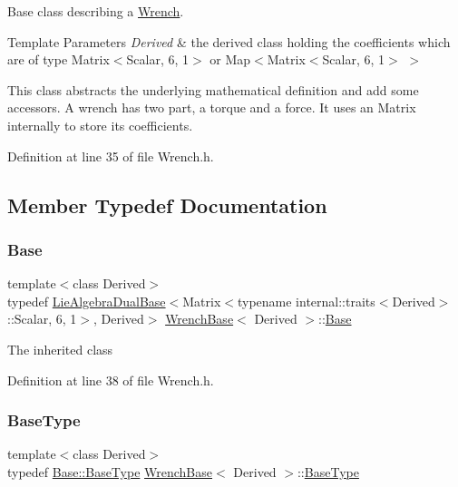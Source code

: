 Base class describing a \hyperlink{class_wrench}{Wrench}. 


\begin{DoxyTemplParams}{Template Parameters}
{\em Derived} & the derived class holding the coefficients which are of type Matrix$<$\+Scalar, 6, 1$>$ or Map$<$Matrix$<$\+Scalar, 6, 1$>$ $>$\\
\hline
\end{DoxyTemplParams}
This class abstracts the underlying mathematical definition and add some accessors. A wrench has two part, a torque and a force. It uses an Matrix internally to store its coefficients. 

Definition at line 35 of file Wrench.\+h.



\subsection{Member Typedef Documentation}
\hypertarget{class_wrench_base_a961baad29dfcc45c7c2b847fa8c5c43d}{}\label{class_wrench_base_a961baad29dfcc45c7c2b847fa8c5c43d} 
\subsubsection{\texorpdfstring{Base}{Base}}
{\footnotesize\ttfamily template$<$class Derived$>$ \\
typedef \hyperlink{class_lie_algebra_dual_base}{Lie\+Algebra\+Dual\+Base}$<$Matrix$<$typename internal\+::traits$<$Derived$>$\+::Scalar, 6, 1$>$, Derived$>$ \hyperlink{class_wrench_base}{Wrench\+Base}$<$ Derived $>$\+::\hyperlink{class_wrench_base_a961baad29dfcc45c7c2b847fa8c5c43d}{Base}\hspace{0.3cm}{\ttfamily [protected]}}

The inherited class 

Definition at line 38 of file Wrench.\+h.

\hypertarget{class_wrench_base_a8b98c467c6fb31bd7354dcbef134dca1}{}\label{class_wrench_base_a8b98c467c6fb31bd7354dcbef134dca1} 
\subsubsection{\texorpdfstring{Base\+Type}{BaseType}}
{\footnotesize\ttfamily template$<$class Derived$>$ \\
typedef \hyperlink{class_lie_algebra_dual_base_3_01_matrix_3_01typename_01internal_1_1traits_3_01_derived_01_4_1_1_7557dc73cbfcbc32e399b9855a977d47_a9593517bd5d02d1330f7940eb5865eda}{Base\+::\+Base\+Type} \hyperlink{class_wrench_base}{Wrench\+Base}$<$ Derived $>$\+::\hyperlink{class_wrench_base_a8b98c467c6fb31bd7354dcbef134dca1}{Base\+Type}}

